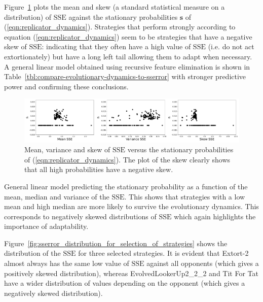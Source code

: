 \documentclass[a4paper]{article}
\newcommand{\SSe}{\text{SSE}}
\begin{document}
Figure~\ref{fig:compare-evolutionary-dynamics-to-sserror} plots the mean and
skew (a standard statistical measure on a distribution) of \(\SSe\) against the
stationary probabilities \(\textbf{s}\) of (\ref{eqn:replicator_dynamics}). Strategies
that perform strongly according to equation (\ref{eqn:replicator_dynamics}) seem
to be strategies that have a negative skew of \(\SSe\): indicating that they
often have a high value of \(\SSe\) (i.e. do not act extortionately) but have a
long left tail allowing them to adapt when necessary. A general linear model
obtained using recursive feature elimination is shown in
Table~\ref{tbl:compare-evolutionary-dynamics-to-sserror} with stronger
predictive power and confirming these conclusions.

\begin{figure}[!hbtp]
    \centering
    \includegraphics[width=\textwidth]{./assets/img/compare-evolutionary-dynamics-to-sserror/main.pdf}
    \caption{Mean, variance and skew of \(\SSe\) versus the stationary
    probabilities of (\ref{eqn:replicator_dynamics}). The plot of the skew
    clearly shows that all high probabilities have a negative skew.}
    \label{fig:compare-evolutionary-dynamics-to-sserror}
\end{figure}

\begin{table}[!hbtp]
    \begin{center}
    \tiny
    
    \end{center}
    \caption{General linear model predicting the stationary probability as a
    function of the mean, median and variance of the \(\SSe\). This shows that strategies with a low mean
    and high median are more likely to survive the evolutionary dynamics. This
    corresponds to negatively skewed distributions of \(\SSe\) which again
    highlights the importance of adaptability.}
    \label{tbl:compare-evolutionary-dynamics-to-sserror}
\end{table}

Figure~\ref{fig:sserror_distribution_for_selection_of_strategies} shows the
distribution of the \(\SSe\) for three selected strategies. It is evident that
Extort-2 almost always has the same low value of \(\SSe\) against all opponents
(which gives a positively skewed distribution), whereas EvolvedLookerUp2\_2\_2
and Tit For Tat have a wider distribution of values depending on the opponent
(which gives a negatively skewed distribution).
\end{document}
